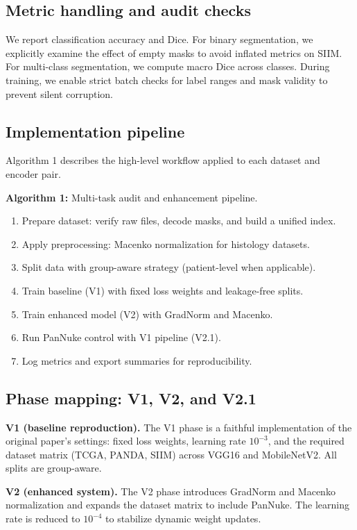 \documentclass[conference,a4paper]{IEEEtran}
\begin{document}
\subsection{Metric handling and audit checks}
We report classification accuracy and Dice. For binary segmentation, we explicitly examine the effect of empty masks to avoid inflated metrics on SIIM. For multi-class segmentation, we compute macro Dice across classes. During training, we enable strict batch checks for label ranges and mask validity to prevent silent corruption.

\subsection{Implementation pipeline}
Algorithm 1 describes the high-level workflow applied to each dataset and encoder pair.

\textbf{Algorithm 1:} Multi-task audit and enhancement pipeline.
\begin{enumerate}
    \item Prepare dataset: verify raw files, decode masks, and build a unified index.
    \item Apply preprocessing: Macenko normalization for histology datasets.
    \item Split data with group-aware strategy (patient-level when applicable).
    \item Train baseline (V1) with fixed loss weights and leakage-free splits.
    \item Train enhanced model (V2) with GradNorm and Macenko.
    \item Run PanNuke control with V1 pipeline (V2.1).
    \item Log metrics and export summaries for reproducibility.
\end{enumerate}

\subsection{Phase mapping: V1, V2, and V2.1}
\textbf{V1 (baseline reproduction).} The V1 phase is a faithful implementation of the original paper's settings: fixed loss weights, learning rate $10^{-3}$, and the required dataset matrix (TCGA, PANDA, SIIM) across VGG16 and MobileNetV2. All splits are group-aware.

\textbf{V2 (enhanced system).} The V2 phase introduces GradNorm and Macenko normalization and expands the dataset matrix to include PanNuke. The learning rate is reduced to $10^{-4}$ to stabilize dynamic weight updates.
\end{document}

